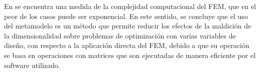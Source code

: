 En \cite{farmaga2011} se encuentra una medida de la complejidad computacional del FEM, que en el peor de los casos puede ser exponencial. En este sentido, se concluye que el uso del metamodelo es un método que permite reducir los efectos de la maldición de la dimensionalidad sobre problemas de optimización con varias variables de diseño, con respecto a la aplicación directa del FEM, debido a que su operación se basa en operaciones con matrices que son ejecutadas de manera eficiente por el software utilizado.


